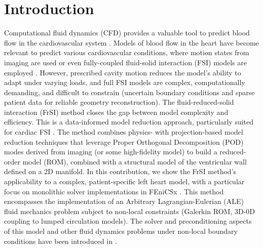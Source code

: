 \section*{Introduction}
Computational fluid dynamics (CFD) provides a valuable tool to predict blood flow in the cardiovascular system \cite{schwarz2023}. 
Models of blood flow in the heart have become relevant to predict various cardiovascular conditions, where motion states from imaging are used \cite{bonini2022-suppl,zingaro2023,garciavillalba2021} or even fully-coupled fluid-solid interaction (FSI) models are employed \cite{nordsletten2011-fsi,mccormick2011modelling}. 
However, prescribed cavity motion reduces the model's ability to adapt under varying loads, and full FSI models are complex, computationally demanding, and difficult to constrain (uncertain boundary conditions and sparse patient data for reliable geometry reconstruction).
The fluid-reduced-solid interaction (FrSI) method closes the gap between model complexity and efficiency. This is a data-informed model reduction approach, particularly suited for cardiac FSI \cite{hirschvogel2024-frsi}. 
The method combines physics- with projection-based model reduction techniques that leverage Proper Orthogonal Decomposition (POD) modes derived from imaging (or some high-fidelity model) to build a reduced-order model (ROM), combined with a structural model of the ventricular wall defined on a 2D manifold.
In this contribution, we show the FrSI method's applicability to a complex, patient-specific left heart model, with a particular focus on monolithic solver implementations in FEniCSx \cite{alnaes2015fenics, baratta2023dolfinx}. This method encompasses the implementation of an Arbitrary Lagrangian-Eulerian (ALE) fluid mechanics problem subject to non-local constraints (Galerkin ROM, 3D-0D coupling to lumped circulation models). 
The solver and preconditioning aspects of this model and other fluid dynamics problems under non-local boundary conditions have been introduced in \cite{hirschvogel2025-prec}.


